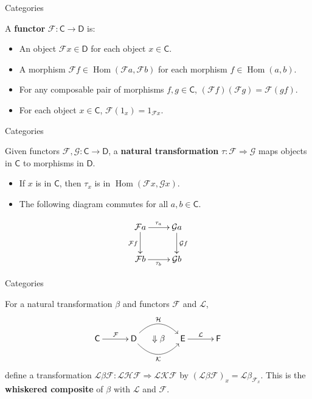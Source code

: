 \documentclass{beamer}
\def\sC{\mathsf{C}}
\def\sD{\mathsf{D}}
\def\cF{\mathcal{F}}
\def\cG{\mathcal{G}}
\DeclareMathOperator{\Hom}{Hom}
\begin{document}
\begin{frame}{Categories}
  \begin{definition}
    A \textbf{functor} $\cF: \sC \to \sD$ is:
    \begin{itemize}
      \item An object $\cF x \in \sD$ for each object $x \in \sC$.
      \item A morphism $\cF f \in \Hom(\cF a,\cF b)$ for each morphism $f \in \Hom(a,b)$.
      \item For any composable pair of morphisms $f,g \in \sC$, $(\cF f) (\cF g) = \cF(gf)$.
      \item For each object $x \in \sC$, $\cF(1_x) = 1_{\cF x}$.
    \end{itemize}
  \end{definition}
\end{frame}

\begin{frame}{Categories}
  \begin{definition}
    Given functors $\cF, \cG: \sC \to \sD$, a \textbf{natural transformation} $\tau: \cF \Rightarrow \cG$ maps objects in $\sC$ to morphisms in $\sD$.
    \begin{itemize}
      \item If $x$ is in $\sC$, then $\tau_x$ is in $\Hom(\cF x, \cG x)$.
      \item The following diagram commutes for all $a,b \in \sC$.
    \end{itemize}
    \[ \SelectTips{cm}{}\xymatrix{
        \cF a \ar[r]^{\tau_a} \ar[d]_{\cF f} & \cG a \ar[d]^{\cG f} \\ \cF b \ar[r]_{\tau_b} & \cG b
    } \]
  \end{definition}
\end{frame}

\begin{frame}{Categories}
  \begin{definition}
    For a natural transformation $\beta$ and functors $\mathcal F$ and $\mathcal L$,
    \[ \SelectTips{cm}{}\xymatrix@C-1pc{
      \sC \ar[0,2]^{\cF} & & \sD \ar@/^1.5pc/[0,2]^{\mathcal H} \ar@/_1.5pc/[0,2]_{\mathcal K} & \Downarrow\beta & \mathsf E \ar[0,2]^{\mathcal L} & & \mathsf F
    } \]
    define a transformation $\mathcal L \beta \mathcal F: \mathcal L \mathcal H \mathcal F \Rightarrow \mathcal L \mathcal K \mathcal F$ by $(\mathcal L \beta \mathcal F)_x = \mathcal L \beta_{\mathcal F_x}$. This is the \textbf{whiskered composite} of $\beta$ with $\mathcal L$ and $\mathcal F$.
  \end{definition}
\end{frame}
\end{document}
